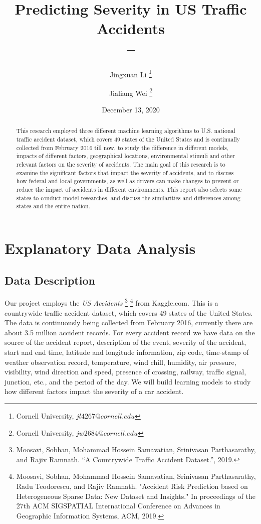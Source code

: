 \documentclass[twocolumn]{article}
\title{Predicting Severity in US Traffic Accidents \\ -- }
\author{Jingxuan Li \footnote{Cornell University, $jl4267@cornell.edu$} \and Jialiang Wei \footnote{Cornell University, $jw2684@cornell.edu$}}
\date{December 13, 2020}
\begin{document}
\begin{titlepage}
\maketitle
\thispagestyle{empty}
\bigskip
\begin{abstract}
This research employed three different machine learning algorithms to U.S. national traffic accident dataset, which covers 49 states of the United States and is continually collected from February 2016 till now, to study the difference in different models, impacts of different factors, geographical locations, environmental stimuli and other relevant factors on the severity of accidents. The main goal of this research is to examine the significant factors that impact the severity of accidents, and to discuss how federal and local governments, as well as drivers can make changes to prevent or reduce the impact of accidents in different environments. This report also selects some states to conduct model researches, and discuss the similarities and differences among states and the entire nation. 

\end{abstract}
\clearpage
{}
\end{titlepage}



\section{Explanatory Data Analysis}

\subsection{Data Description}
Our project employs the \textit{US Accidents} \footnote{Moosavi, Sobhan, Mohammad Hossein Samavatian, Srinivasan Parthasarathy, and Rajiv Ramnath. “A Countrywide Traffic Accident Dataset.”, 2019.} \footnote{Moosavi, Sobhan, Mohammad Hossein Samavatian, Srinivasan Parthasarathy, Radu Teodorescu, and Rajiv Ramnath. "Accident Risk Prediction based on Heterogeneous Sparse Data: New Dataset and Insights." In proceedings of the 27th ACM SIGSPATIAL International Conference on Advances in Geographic Information Systems, ACM, 2019.} from Kaggle.com. This is a countrywide traffic accident dataset, which covers 49 states of the United
States. The data is continuously being collected from February 2016, currently there
are about 3.5 million accident records. For every accident record we
have data on the source of the accident report, description of the event,
severity of the accident, start and end time, latitude and longitude information, zip code, time-stamp of weather observation record,
temperature, wind chill, humidity, air pressure, visibility, wind direction and speed,
presence of crossing, railway, traffic signal, junction, etc., and the period of the day.
We will build learning models to study how different factors impact the severity of a car accident.
\end{document}
